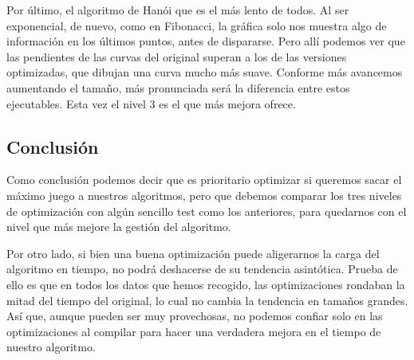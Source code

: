 \documentclass[a4paper, 11pt]{article}
\begin{document}
Por último, el algoritmo de Hanói que es el más lento de todos. Al ser exponencial, de nuevo, como en Fibonacci, la gráfica solo nos muestra algo de información en los últimos puntos, antes de dispararse. Pero allí podemos ver que las pendientes de las curvas del original superan a los de las versiones optimizadas, que dibujan una curva mucho más suave. Conforme más avancemos aumentando el tamaño, más pronunciada será la diferencia entre estos ejecutables. Esta vez el nivel 3 es el que más mejora ofrece.

\newpage
\subsection{Conclusión}
Como conclusión podemos decir que es prioritario optimizar si queremos sacar el máximo juego a nuestros algoritmos, pero que debemos comparar los tres niveles de optimización con algún sencillo test como los anteriores, para quedarnos con el nivel que más mejore la gestión del algoritmo.

Por otro lado, si bien una buena optimización puede aligerarnos la carga del algoritmo en tiempo, no podrá deshacerse de su tendencia asintótica. Prueba de ello es que en todos los datos que hemos recogido, las optimizaciones rondaban la mitad del tiempo del original, lo cual no cambia la tendencia en tamaños grandes. Así que, aunque pueden ser muy provechosas, no podemos confiar solo en las optimizaciones al compilar para hacer una verdadera mejora en el tiempo de nuestro algoritmo. 
\end{document}
